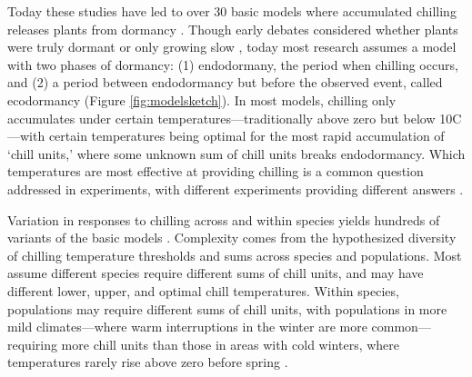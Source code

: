 \documentclass[11pt]{article}
\begin{document}
Today these studies have led to over 30 basic models where accumulated chilling releases plants from dormancy \citep[][]{basler2016evaluating,hufkens2018integrated}. Though early debates considered whether plants were truly dormant or only growing slow \citep[`dormancy' or `rest' versus `quiescence';][]{considine2016language}, today most research assumes a model with two phases of dormancy: (1) endodormany, the period when chilling occurs, and (2) a period between endodormancy but before the observed event, called  ecodormancy (Figure \ref{fig:modelsketch}).  In most models, chilling only accumulates under certain temperatures---traditionally above zero but below 10\degree C---with certain temperatures 
being optimal for the most rapid accumulation of `chill units,' where some unknown sum of chill units breaks endodormancy. Which temperatures are most effective at providing chilling is a common question addressed in experiments, with different experiments providing different answers \citep{vitasselev,baum2021}. 

Variation in responses to chilling across and within species yields hundreds of variants of the basic models \citep[][]{basler2016evaluating,hufkens2018integrated}. Complexity comes from the hypothesized diversity of chilling temperature thresholds and sums across species and populations. Most assume different species require different sums of chill units, and may have different lower, upper, and optimal chill temperatures. Within species, populations may require different sums of chill units, with populations in more mild climates---where warm interruptions in the winter are more common---requiring more chill units than those in areas with cold winters, where temperatures rarely rise above zero before spring \citep{campbell1979,leinonen1996dependence}.  
\end{document}
